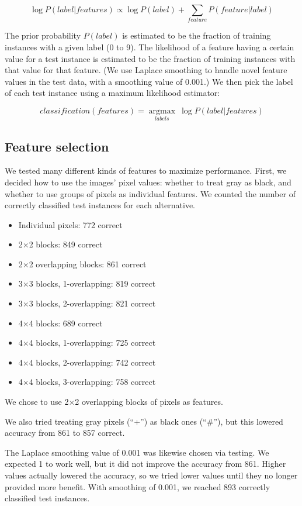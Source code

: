 \documentclass[11pt]{article}
\begin{document}
$$\log P(label|features) \propto \log P(label) + \sum_{feature} P(feature|label)$$

The prior probability $P(label)$ is estimated to be the fraction of training instances
with a given label (0 to 9). The likelihood of a feature having a certain value for a test
instance is estimated to be the fraction of training instances with that value for that
feature. (We use Laplace smoothing to handle novel feature values in the test data,
with a smoothing value of 0.001.) We then pick the label of each test instance using a
maximum likelihood estimator:

$$classification(features) = \underset{labels}{\operatorname{argmax}} \ \log P(label|features)$$

\subsection{Feature selection}

We tested many different kinds of features to maximize performance. First, we decided
how to use the images' pixel values: whether to treat gray as black, and whether to use
groups of pixels as individual features. We counted the number of correctly classified
test instances for each alternative.

\begin{itemize}[noitemsep]
\item Individual pixels: 772 correct
\item 2$\times$2 blocks: 849 correct
\item 2$\times$2 overlapping blocks: 861 correct
\item 3$\times$3 blocks, 1-overlapping: 819 correct
\item 3$\times$3 blocks, 2-overlapping: 821 correct
\item 4$\times$4 blocks: 689 correct
\item 4$\times$4 blocks, 1-overlapping: 725 correct
\item 4$\times$4 blocks, 2-overlapping: 742 correct
\item 4$\times$4 blocks, 3-overlapping: 758 correct
\end{itemize}

We chose to use 2$\times$2 overlapping blocks of pixels as features.

We also tried treating gray pixels (``+'') as black ones (``\#''), but this lowered
accuracy from 861 to 857 correct.

The Laplace smoothing value of 0.001 was likewise chosen via testing. We expected 1 to
work well, but it did not improve the accuracy from 861. Higher values actually lowered
the accuracy, so we tried lower values until they no longer provided more benefit. With
smoothing of 0.001, we reached 893 correctly classified test instances.
\end{document}
